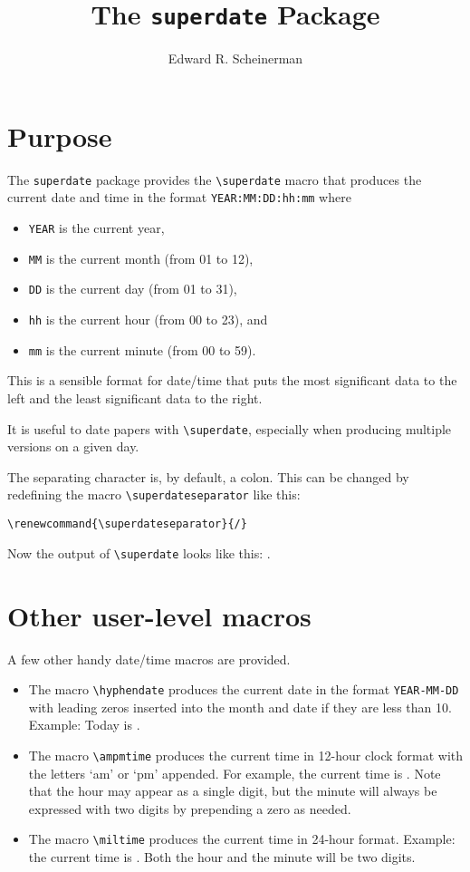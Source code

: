 \documentclass[12pt]{amsart}
\title{The \texttt{superdate} Package}
\author{Edward R. Scheinerman}
\date{\superdate}
\begin{document}
\maketitle

\section{Purpose}

The \verb|superdate| package provides the \verb|\superdate| macro that
produces the current date and time in the format
\verb|YEAR:MM:DD:hh:mm| where
\begin{itemize}
\item \verb|YEAR| is the current year,
\item \verb|MM| is the current month (from 01 to 12),
\item \verb|DD| is the current day (from 01 to 31),
\item \verb|hh| is the current hour (from 00 to 23), and 
\item \verb|mm| is the current minute (from 00 to 59).
\end{itemize}

This is a sensible format for date/time that puts the most significant
data to the left and the least significant data to the right. 

It is useful to date papers with \verb|\superdate|, especially when
producing multiple versions on a given day.

The separating character is, by default, a colon. This can be changed
by redefining the macro \verb|\superdateseparator| like this:
\begin{verbatim}
\renewcommand{\superdateseparator}{/}
\end{verbatim}
\renewcommand{\superdateseparator}{/}%
Now the output of \verb|\superdate| looks like
this: \superdate.


\section{Other user-level macros}
\label{sect:user}


A few other handy date/time macros are provided.
\begin{itemize}
\item The macro \verb|\hyphendate| produces the current date in the
  format \verb|YEAR-MM-DD| with leading zeros inserted into the month
  and date if they are less than 10. Example: Today is \hyphendate.


\item The macro \verb|\ampmtime| produces the current time in 12-hour
  clock format with the letters `am' or `pm' appended. For example,
  the current time is \ampmtime. Note that the hour may appear as a
  single digit, but the minute will always be expressed with two
  digits by prepending a zero as needed.

\item The macro \verb|\miltime| produces the current time in 24-hour
  format. Example: the current time is \miltime. Both the hour and the
  minute will be two digits.
\end{itemize}
\end{document}
